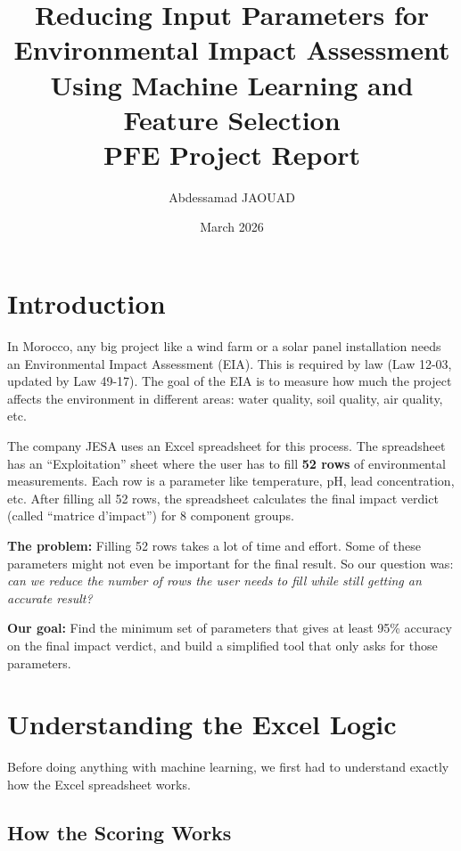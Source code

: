 \documentclass[12pt,a4paper]{article}
\title{
    \vspace{-1cm}
    \textbf{Reducing Input Parameters for \\Environmental Impact Assessment}\\[0.3cm]
    \large Using Machine Learning and Feature Selection\\[0.2cm]
    \normalsize PFE Project Report
}
\author{Abdessamad JAOUAD}
\date{March 2026}
\begin{document}
\maketitle

\section{Introduction}

In Morocco, any big project like a wind farm or a solar panel installation needs an Environmental Impact Assessment (EIA). This is required by law (Law 12-03, updated by Law 49-17). The goal of the EIA is to measure how much the project affects the environment in different areas: water quality, soil quality, air quality, etc.

The company JESA uses an Excel spreadsheet for this process. The spreadsheet has an ``Exploitation'' sheet where the user has to fill \textbf{52 rows} of environmental measurements. Each row is a parameter like temperature, pH, lead concentration, etc. After filling all 52 rows, the spreadsheet calculates the final impact verdict (called ``matrice d'impact'') for 8 component groups.

\textbf{The problem:} Filling 52 rows takes a lot of time and effort. Some of these parameters might not even be important for the final result. So our question was: \textit{can we reduce the number of rows the user needs to fill while still getting an accurate result?}

\textbf{Our goal:} Find the minimum set of parameters that gives at least 95\% accuracy on the final impact verdict, and build a simplified tool that only asks for those parameters.

\section{Understanding the Excel Logic}

Before doing anything with machine learning, we first had to understand exactly how the Excel spreadsheet works.

\subsection{How the Scoring Works}
\end{document}
